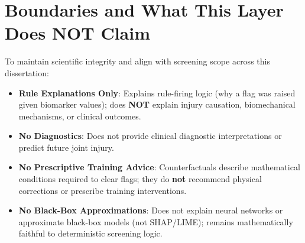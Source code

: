 \section{Boundaries and What This Layer Does NOT Claim}
\label{sec:12-8-boundaries-and-what-this-layer-does-not-claim}


To maintain scientific integrity and align with screening scope across this dissertation:
\begin{itemize}
  \item \textbf{Rule Explanations Only}: Explains rule-firing logic (why a flag was raised given biomarker values); does \textbf{NOT} explain injury causation, biomechanical mechanisms, or clinical outcomes.
  \item \textbf{No Diagnostics}: Does not provide clinical diagnostic interpretations or predict future joint injury.
  \item \textbf{No Prescriptive Training Advice}: Counterfactuals describe mathematical conditions required to clear flags; they do \textbf{not} recommend physical corrections or prescribe training interventions.
  \item \textbf{No Black-Box Approximations}: Does not explain neural networks or approximate black-box models (not SHAP/LIME); remains mathematically faithful to deterministic screening logic.
\end{itemize}